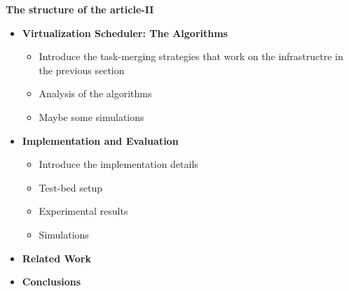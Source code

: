 \begin{frame}{\textbf{The structure of the article-II}}
	
	\begin{itemize}
		\item \textbf{Virtualization Scheduler: The Algorithms}
		\begin{itemize}
			\item Introduce the task-merging strategies that work on the infrastructre in the previous section
			\item Analysis of the algorithms
			\item Maybe some simulations
		\end{itemize}
		\item \textbf{Implementation and Evaluation}
		\begin{itemize}
			\item Introduce the implementation details
			\item Test-bed setup
			\item Experimental results
			\item Simulations
		\end{itemize}
		\item \textbf{Related Work}
		\item \textbf{Conclusions}
	\end{itemize}
	
\end{frame}



